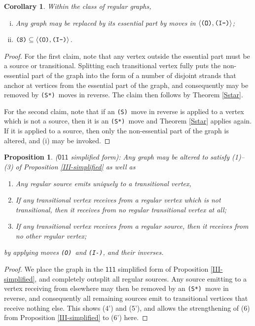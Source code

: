 \documentclass[12pt]{amsbook}%
\newtheorem{propo}[theor]{Proposition}
\newtheorem{corol}[theor]{Corollary}
\theoremstyle{defin}
\theoremstyle{remark}
\numberwithin{equation}{chapter}
\numberwithin{theor}{section}
\newcommand{\xyz}[1]{\mbox{$\mathsf{#1}$}}
\newcommand{\IIIm}{\mbox{\texttt{\textup{(I-)}}}}
\newcommand{\OOO}{\mbox{\texttt{\textup{(O)}}}}
\newcommand{\SSS}{\mbox{\texttt{\textup{(S)}}}}
\newcommand{\SSSs}{\mbox{\texttt{\textup{(S*)}}}}
\begin{document}
\begin{corol}\label{Sstarreg} Within the class of regular graphs,
\begin{enumerate}[(i)]
\item Any graph may be replaced by its essential part by moves in $\langle \OOO,\IIIm\rangle$;
\item $\SSS \subseteq \langle\OOO,\IIIm\rangle$.
\end{enumerate}
\end{corol}
\begin{proof}
For the first claim, note that any vertex outside the essential part must be a source or transitional. Splitting each transitional vertex fully puts the non-essential part of the graph into the form of a number of disjoint strands that anchor at vertices from the essential part of the graph, and consequently may be removed by \SSSs\ moves in reverse. The claim then follows  by Theorem \ref{Sstar}.

For the second claim, note that if an \SSS\ move in reverse is applied to a vertex which is not a source, then it is an \SSSs\ move and Theorem \ref{Sstar} applies again. If it is applied to a source, then only the non-essential part of the graph is altered, and (i) may be invoked.
\end{proof}

\begin{propo}\label{OII-simplified}
\emph{(\xyz{011} simplified form):} Any graph may be altered to satisfy (1)--(3) of Proposition \ref{III-simplified} as well as
\begin{enumerate}[(1')]\addtocounter{enumi}{3} 
\item Any regular source emits uniquely to a transitional vertex,
\item If any transitional vertex receives from a regular vertex which is not transitional, then it receives from no regular transitional vertex at all;
\item If any transitional vertex receives  from a regular source, then it receives from no other regular vertex;

\end{enumerate}
by applying moves \OOO\ and \IIIm, and their inverses.
\end{propo}
\begin{proof}
We place the graph in the \xyz{111} simplified form of Proposition \ref{III-simplified}, and completely outsplit all regular sources. Any source emitting to a vertex receiving from elsewhere may then be removed by an \SSSs\ move in reverse, and consequently all remaining sources emit to transitional vertices that receive nothing else. This shows (4') and (5'), and allows the strengthening of (6) from Proposition \ref{III-simplified} to (6') here.
\end{proof}
\end{document}
